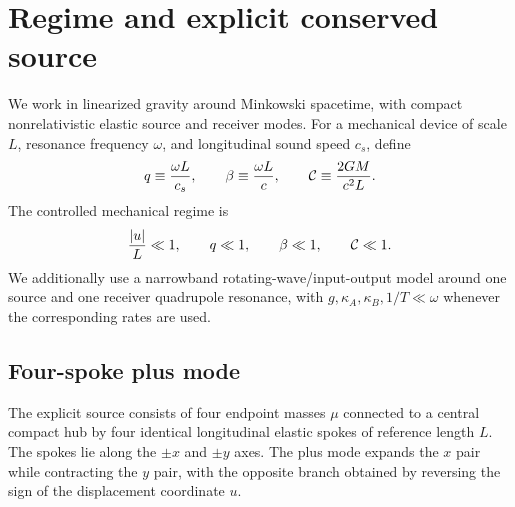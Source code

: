 \section{Regime and explicit conserved source}
\label{sec:source}

We work in linearized gravity around Minkowski spacetime, with compact nonrelativistic elastic source and receiver modes. For a mechanical device of scale $L$, resonance frequency $\omega$, and longitudinal sound speed $c_s$, define
\begin{equation}
q\equiv\frac{\omega L}{c_s},
\qquad
\beta\equiv\frac{\omega L}{c},
\qquad
\mathcal C\equiv\frac{2GM}{c^2L}.
\end{equation}
The controlled mechanical regime is
\begin{equation}
\frac{|u|}{L}\ll1,
\qquad q\ll1,
\qquad \beta\ll1,
\qquad \mathcal C\ll1.
\label{eq:regime}
\end{equation}
We additionally use a narrowband rotating-wave/input-output model around one source and one receiver quadrupole resonance, with $g,\kappa_A,\kappa_B,1/T\ll\omega$ whenever the corresponding rates are used.

\subsection{Four-spoke plus mode}

The explicit source consists of four endpoint masses $\mu$ connected to a central compact hub by four identical longitudinal elastic spokes of reference length $L$. The spokes lie along the $\pm x$ and $\pm y$ axes. The plus mode expands the $x$ pair while contracting the $y$ pair, with the opposite branch obtained by reversing the sign of the displacement coordinate $u$.


